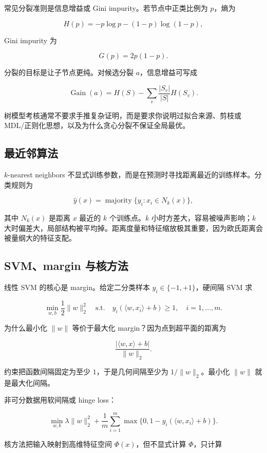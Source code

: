 常见分裂准则是信息增益或 Gini impurity。若节点中正类比例为 \(p\)，熵为

\[
  H(p)=-p\log p-(1-p)\log(1-p),
\]

Gini impurity 为

\[
  G(p)=2p(1-p).
\]

分裂的目标是让子节点更纯。对候选分裂 \(a\)，信息增益可写成

\[
  \operatorname{Gain}(a)
  =
  H(S)
  -
  \sum_{v}
  \frac{|S_v|}{|S|}
  H(S_v).
\]

树模型考核通常不要求手推复杂证明，而是要求你说明过拟合来源、剪枝或 MDL/正则化思想，以及为什么贪心分裂不保证全局最优。

\subsection{最近邻算法}

\(k\)-nearest neighbors 不显式训练参数，而是在预测时寻找距离最近的训练样本。分类规则为

\[
  \hat y(x)
  =
  \operatorname{majority}
  \{y_i:x_i\in N_k(x)\},
\]

其中 \(N_k(x)\) 是距离 \(x\) 最近的 \(k\) 个训练点。\(k\) 小时方差大，容易被噪声影响；\(k\) 大时偏差大，局部结构被平均掉。距离度量和特征缩放极其重要，因为欧氏距离会被量纲大的特征支配。

\subsection{SVM、margin 与核方法}


线性 SVM 的核心是 margin。给定二分类样本 \(y_i\in\{-1,+1\}\)，硬间隔 SVM 求

\[
  \min_{w,b}\frac12\|w\|_2^2
  \quad
  \text{s.t.}
  \quad
  y_i(\langle w,x_i\rangle+b)\ge 1,\quad i=1,\ldots,m.
\]

为什么最小化 \(\|w\|\) 等价于最大化 margin？因为点到超平面的距离为

\[
  \frac{|\langle w,x\rangle+b|}{\|w\|_2}.
\]

约束把函数间隔固定为至少 \(1\)，于是几何间隔至少为 \(1/\|w\|_2\)。最小化 \(\|w\|\) 就是最大化间隔。

非可分数据用软间隔或 hinge loss：

\[
  \min_{w,b}
  \lambda\|w\|_2^2
  +
  \frac1m
  \sum_{i=1}^{m}
  \max\{0,1-y_i(\langle w,x_i\rangle+b)\}.
\]

核方法把输入映射到高维特征空间 \(\Phi(x)\)，但不显式计算 \(\Phi\)，只计算

